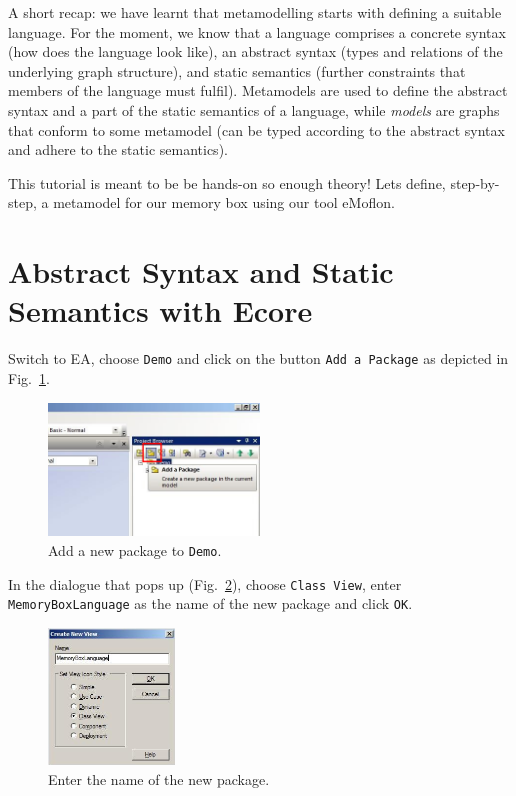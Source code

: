 A short recap:  we have learnt that metamodelling starts with defining a
suitable language.  
For the moment, we know that a language comprises a concrete
syntax (how does the language look like),  an abstract syntax (types and
relations of the underlying graph structure), and static semantics (further
constraints that members of the language must fulfil).
Metamodels are used to define the abstract syntax and a part of the static
semantics of a language, while \emph{models} are graphs that conform to some
metamodel (can be typed  according to the abstract syntax and adhere to the
static semantics). 

This tutorial is meant to be be hands-on so enough theory!  Lets
define, step-by-step, a metamodel for our memory box using our tool eMoflon.  
 
\section*{Abstract Syntax and Static Semantics with Ecore}

Switch to EA, choose \texttt{Demo} and click on the button \texttt{Add a
Package} as depicted in Fig.~\ref{fig:new_package}.   

\begin{figure}[htbp]
	\centering
  \includegraphics[width=0.5\textwidth]{pics/memBox01.png}
	\caption{Add a new package to \texttt{Demo}.}
	\label{fig:new_package}
\end{figure} 

In the dialogue that pops up (Fig.~\ref{fig:new_package_name}), choose
\texttt{Class View}, enter \texttt{Memory\-Box\-Language} as the name of the new
package and click \texttt{OK}. 

\begin{figure}[htbp]
	\centering
  \includegraphics[width=0.3\textwidth]{pics/memBox02.png}
	\caption{Enter the name of the new package.}
	\label{fig:new_package_name}
\end{figure}

